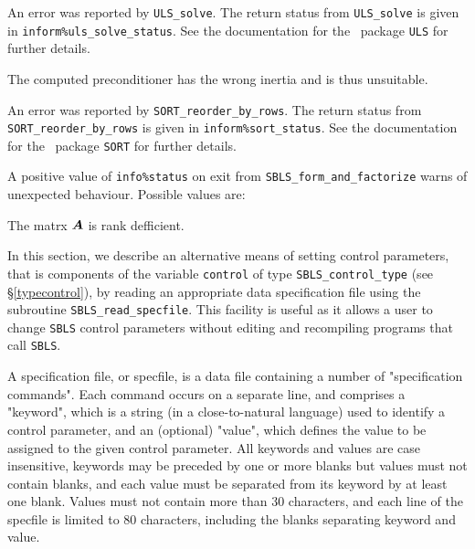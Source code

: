 \documentclass{galahad}
\newcommand{\packagename}{SBLS}
\begin{document}
\begin{description}
 An error was reported by {\tt ULS\_solve}. The return
status from {\tt ULS\_solve} is given in {\tt inform\%uls\_solve\_status}.
See the documentation for the \galahad\ package {\tt ULS} for further details.

 The computed preconditioner has the wrong 
inertia and is thus unsuitable.

 An error was reported by {\tt SORT\_reorder\_by\_rows}. 
The return status from {\tt SORT\_reorder\_by\_rows} 
is given in {\tt inform\%sort\_status}.
See the documentation for the \galahad\ package {\tt SORT} for further details.

\end{description}

A positive value of {\tt info\%status} on exit from 
{\tt \packagename\_form\_and\_factorize} warns of unexpected behaviour.
Possible values are:

\begin{description}

 The matrx ${\bm{A}}$ is rank defficient. 

\end{description}


\galfeatures
\noindent In this section, we describe an alternative means of setting 
control parameters, that is components of the variable {\tt control} of type
{\tt \packagename\_control\_type}
(see \S\ref{typecontrol}), 
by reading an appropriate data specification file using the
subroutine {\tt \packagename\_read\_specfile}. This facility
is useful as it allows a user to change  {\tt \packagename} control parameters 
without editing and recompiling programs that call {\tt \packagename}.

A specification file, or specfile, is a data file containing a number of 
"specification commands". Each command occurs on a separate line, 
and comprises a "keyword", 
which is a string (in a close-to-natural language) used to identify a 
control parameter, and 
an (optional) "value", which defines the value to be assigned to the given
control parameter. All keywords and values are case insensitive, 
keywords may be preceded by one or more blanks but
values must not contain blanks, and
each value must be separated from its keyword by at least one blank.
Values must not contain more than 30 characters, and 
each line of the specfile is limited to 80 characters,
including the blanks separating keyword and value.
\end{document}
